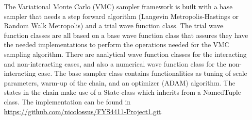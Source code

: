 The Variational Monte Carlo (VMC) sampler framework is built with a base sampler that needs a step forward algorithm (Langevin Metropolis-Hastings or Random Walk Metropolis) and a trial wave function class. The trial wave function classes are all based on a base wave function class that assures they have the needed implementations to perform the operations needed for the VMC sampling algorithm. There are analytical wave function classes for the interacting and non-interacting cases, and also a numerical wave function class for the non-interacting case. The base sampler class contains functionalities as tuning of scale parameters, warm-up of the chain, and an optimizer (ADAM) algorithm. The states in the chain make use of a State-class which inherits from a NamedTuple class. The implementation can be found in \url{https://github.com/nicolossus/FYS4411-Project1.git}. %
